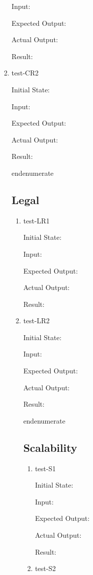 \documentclass[12pt, titlepage]{article}
\begin{document}
\begin{enumerate}
\begin{enumerate}
\begin{enumerate}
\begin{enumerate}
\begin{enumerate}
\begin{enumerate}
\begin{enumerate}
  Input:

  Expected Output:

  Actual Output:

  Result:

  \item{test-CR2} \label{test-CR2}

  Initial State:

  Input:

  Expected Output:

  Actual Output:

  Result:

end{enumerate}

\subsection{Legal} \label{section:4.8}

\begin{enumerate}

  \item{test-LR1} \label{test-LR1}

  Initial State:

  Input:

  Expected Output:

  Actual Output:

  Result:

  \item{test-LR2} \label{test-LR2}

  Initial State:

  Input:

  Expected Output:

  Actual Output:

  Result:

end{enumerate}

\subsection{Scalability} \label{section:4.9}

\begin{enumerate}

  \item{test-S1} \label{test-S1}

  Initial State:

  Input:

  Expected Output:

  Actual Output:

  Result:

  \item{test-S2} \label{test-S2}


\end{enumerate}
\end{enumerate}
\end{enumerate}
\end{enumerate}
\end{enumerate}
\end{enumerate}
\end{enumerate}
\end{enumerate}
\end{enumerate}
\end{document}
